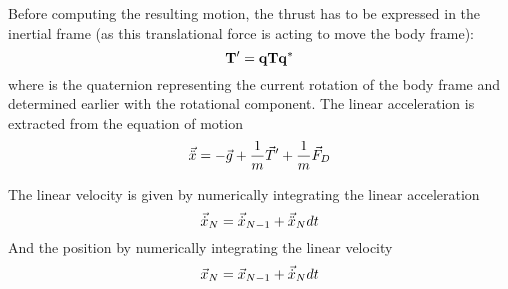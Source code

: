Before computing the resulting motion, the thrust has to be expressed in the
inertial frame (as this translational force is acting to move the body frame):
\begin{equation}
	\mathbf{T'} = \mathbf{q}\mathbf{T}\mathbf{q^*}
\end{equation}
where  is the quaternion representing the current rotation of the body
frame and determined earlier with the rotational component.
The linear acceleration is extracted from the equation of motion
\begin{equation}
	\vec{\ddot{x}} = -\vec{g} + \frac{1}{m}\vec{T}' + \frac{1}{m}\vec{F}_D
\end{equation}

The linear velocity is given by numerically integrating the linear acceleration 
\begin{equation}
	\vec{\dot{x}}_N = \vec{\dot{x}}_{N-1} + \vec{\ddot{x}}_N dt
\end{equation}
And the position by numerically integrating the linear velocity
\begin{equation}
	\vec{x}_N = \vec{x}_{N-1} + \vec{\dot{x}}_N dt
\end{equation}


